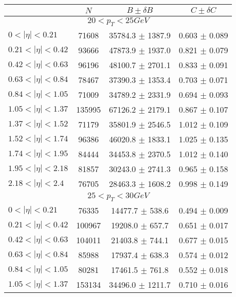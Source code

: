 \begin{tabular}{lccc}
\hline
    &   $N$   & $B \pm \delta B$  &  $C \pm \delta C$ \\
\hline
\hline
\multicolumn{4}{c}{$20 < p_{T} < 25 GeV$} \\
\hline
$0 < |\eta| <0.21$             & 71608      & 35784.3    $\pm$ 1387.9 & 0.603      $\pm$ 0.089 \\
$0.21 < |\eta| <0.42$          & 93666      & 47873.9    $\pm$ 1937.0 & 0.821      $\pm$ 0.079 \\
$0.42 < |\eta| <0.63$          & 96196      & 48100.7    $\pm$ 2701.1 & 0.833      $\pm$ 0.091 \\
$0.63 < |\eta| <0.84$          & 78467      & 37390.3    $\pm$ 1353.4 & 0.703      $\pm$ 0.071 \\
$0.84 < |\eta| <1.05$          & 71009      & 34789.2    $\pm$ 2331.9 & 0.694      $\pm$ 0.093 \\
$1.05 < |\eta| <1.37$          & 135995     & 67126.2    $\pm$ 2179.1 & 0.867      $\pm$ 0.107 \\
$1.37 < |\eta| <1.52$          & 71179      & 35801.9    $\pm$ 2546.5 & 1.012      $\pm$ 0.109 \\
$1.52 < |\eta| <1.74$          & 96386      & 46020.8    $\pm$ 1833.1 & 1.025      $\pm$ 0.135 \\
$1.74 < |\eta| <1.95$          & 84444      & 34453.8    $\pm$ 2370.5 & 1.012      $\pm$ 0.140 \\
$1.95 < |\eta| <2.18$          & 81857      & 30243.0    $\pm$ 2741.3 & 0.965      $\pm$ 0.158 \\
$2.18 < |\eta| <2.4$           & 76705      & 28463.3    $\pm$ 1608.2 & 0.998      $\pm$ 0.149 \\
\hline
\multicolumn{4}{c}{$25 < p_{T} < 30 GeV$} \\
\hline
$0 < |\eta| <0.21$             & 76335      & 14477.7    $\pm$ 538.6 & 0.494      $\pm$ 0.009 \\
$0.21 < |\eta| <0.42$          & 100967     & 19208.0    $\pm$ 657.7 & 0.651      $\pm$ 0.017 \\
$0.42 < |\eta| <0.63$          & 104011     & 21403.8    $\pm$ 744.1 & 0.677      $\pm$ 0.015 \\
$0.63 < |\eta| <0.84$          & 85988      & 17937.4    $\pm$ 638.3 & 0.574      $\pm$ 0.012 \\
$0.84 < |\eta| <1.05$          & 80281      & 17461.5    $\pm$ 761.8 & 0.552      $\pm$ 0.018 \\
$1.05 < |\eta| <1.37$          & 153134     & 34496.0    $\pm$ 1211.7 & 0.710      $\pm$ 0.016 \\

\end{tabular}
